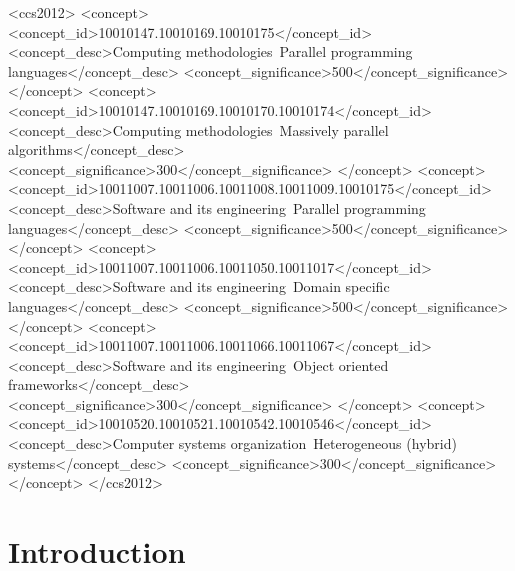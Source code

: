 \documentclass[sigplan, review, authordraft]{acmart}
\begin{document}
%
\begin{CCSXML}
<ccs2012>
<concept>
<concept_id>10010147.10010169.10010175</concept_id>
<concept_desc>Computing methodologies~Parallel programming languages</concept_desc>
<concept_significance>500</concept_significance>
</concept>
<concept>
<concept_id>10010147.10010169.10010170.10010174</concept_id>
<concept_desc>Computing methodologies~Massively parallel algorithms</concept_desc>
<concept_significance>300</concept_significance>
</concept>
<concept>
<concept_id>10011007.10011006.10011008.10011009.10010175</concept_id>
<concept_desc>Software and its engineering~Parallel programming languages</concept_desc>
<concept_significance>500</concept_significance>
</concept>
<concept>
<concept_id>10011007.10011006.10011050.10011017</concept_id>
<concept_desc>Software and its engineering~Domain specific languages</concept_desc>
<concept_significance>500</concept_significance>
</concept>
<concept>
<concept_id>10011007.10011006.10011066.10011067</concept_id>
<concept_desc>Software and its engineering~Object oriented frameworks</concept_desc>
<concept_significance>300</concept_significance>
</concept>
<concept>
<concept_id>10010520.10010521.10010542.10010546</concept_id>
<concept_desc>Computer systems organization~Heterogeneous (hybrid) systems</concept_desc>
<concept_significance>300</concept_significance>
</concept>
</ccs2012>
\end{CCSXML}




\maketitle

\section{Introduction}
\label{sec:introduction}
\end{document}
